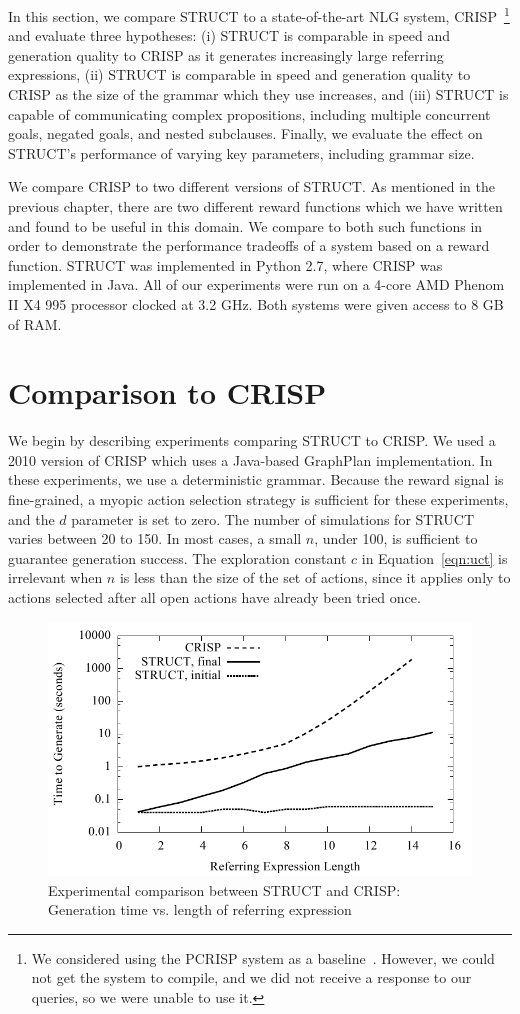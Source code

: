 In this section, we compare STRUCT to a state-of-the-art NLG system,
CRISP~\footnote{We considered using the PCRISP system as a
  baseline~\cite{bauer_sentence_2010}. However, we could not get the system to
  compile, and we did not receive a response to our queries, so we were
  unable to use it.}
and evaluate three hypotheses: (i) STRUCT is
comparable in speed and generation quality to CRISP as it generates
increasingly large referring expressions, (ii) STRUCT is
comparable in speed and generation quality to CRISP as the size of the
grammar which they use increases, and (iii) STRUCT is capable of
communicating complex propositions, including multiple concurrent
goals, negated goals, and nested subclauses.
Finally, we evaluate the effect on STRUCT's performance 
of varying key parameters, including grammar size.

We compare CRISP to two different versions of STRUCT.
As mentioned in the previous chapter, there are two different reward
functions which we have written and found to be useful in this
domain.  We compare to both such functions in order to demonstrate
the performance tradeoffs of a system based on a reward function.
STRUCT was implemented in Python 2.7, where CRISP was implemented
in Java.  All of our experiments were run on a 4-core AMD Phenom II X4 995 processor
clocked at 3.2 GHz.  Both systems were given access to 8 GB of RAM.

\section{Comparison to CRISP}

We begin by describing experiments comparing STRUCT to CRISP. We used a
2010 version of CRISP  which uses a Java-based GraphPlan
implementation. In these
experiments, we use a deterministic grammar.
Because the reward signal is fine-grained,
 a myopic action selection strategy is
sufficient for these experiments, and 
the $d$ parameter is set to zero. The
number of simulations for STRUCT varies between 20 to 150.
In most cases, a small $n$, under 100, is sufficient
to guarantee generation success.  The exploration constant $c$ in
Equation~\ref{eqn:uct} is irrelevant when $n$ is less than the size
of the set of actions, since it
applies only to actions selected after all open actions have already
been tried once.

\begin{figure}
\centering
\includegraphics[width=0.7 \linewidth ]{../analysis/plots/complex-goal/complex-goal.pdf}
\caption{Experimental comparison between STRUCT and  CRISP: 
Generation time vs. length of referring expression }
\label{crisp-comparison-gentime}
\end{figure}


